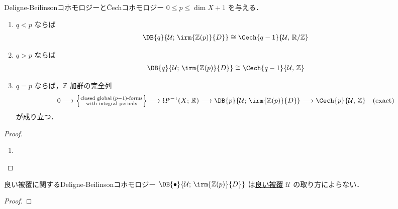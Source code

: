 \documentclass[TQFT_main]{subfiles}
\begin{document}
\begin{myprop}[label=prop:Deligne-Beilinson]{Deligne-Beilinsonコホモロジーと\v{C}echコホモロジー}
    $0 \le p \le \dim X + 1$ を与える．
    \begin{enumerate}
        \item $q < p$ ならば
        \begin{align}
            \DB{q}{\mathcal{U};\, \irm{\mathbb{Z}(p)}{D}} \cong \Cech{q-1}{\mathcal{U},\, \mathbb{R}/\mathbb{Z}}
        \end{align}
        \item $q > p$ ならば
        \begin{align}
            \DB{q}{\mathcal{U};\, \irm{\mathbb{Z}(p)}{D}} \cong \Cech{q-1}{\mathcal{U},\, \mathbb{Z}}
        \end{align}
        \item $q=p$ ならば，$\mathbb{Z}$ 加群の完全列
        \begin{align}
            0 \lto \Bigl\{ \substack{\text{closed global}\, (p-1)\text{-forms} \\ \text{with integral periods}} \Bigr\} \lto \Omega^{p-1}(X;\, \mathbb{R}) \lto \DB{p}{\mathcal{U};\, \irm{\mathbb{Z}(p)}{D}} \lto \Cech{p}{\mathcal{U},\, \mathbb{Z}} \quad (\text{exact})
        \end{align}
        が成り立つ．
    \end{enumerate}
\end{myprop}

\begin{proof}
    \begin{enumerate}
        \item 
    \end{enumerate}
\end{proof}

\begin{myprop}[label=prop:DB-good-cover]{良い被覆に関するDeligne-Beilinsonコホモロジー}
    $\DB{\bullet}{\mathcal{U};\, \irm{\mathbb{Z}(p)}{D}}$ は\hyperref[def:good-cover]{良い被覆} $\mathcal{U}$ の取り方によらない．
\end{myprop}

\begin{proof}
    
\end{proof}
\end{document}
